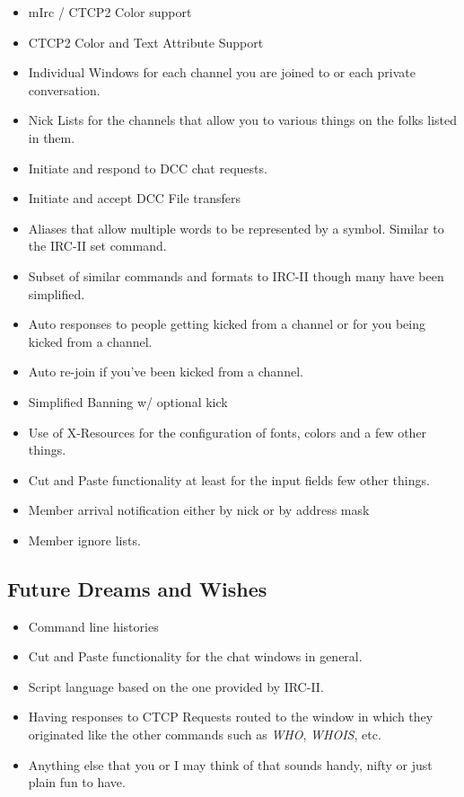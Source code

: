 \documentclass[titlepage]{article}
\begin{document}
\begin{itemize}
\item mIrc / CTCP2 Color support
\item CTCP2 Color and Text Attribute Support
\item Individual Windows for each channel you are joined to or each 
private conversation.
\item Nick Lists for the channels that allow you to various things on 
the folks listed in them.
\item Initiate and respond to DCC chat requests.
\item Initiate and accept DCC File transfers
\item Aliases that allow multiple words to be represented by a symbol.
Similar to the IRC-II set command.
\item Subset of similar commands and formats to IRC-II though many have
been simplified.
\item Auto responses to people getting kicked from a channel or for 
you being kicked from a channel.
\item Auto re-join if you've been kicked from a channel.
\item Simplified Banning w/ optional kick
\item Use of X-Resources for the configuration of fonts, colors and a
few other things.
\item Cut and Paste functionality at least for the input fields
few other things.
\item Member arrival notification either by nick or by address mask
\item Member ignore lists.
\end{itemize}

\subsection{Future Dreams and Wishes}
\begin{itemize}
\item Command line histories
\item Cut and Paste functionality for the chat windows in general.
\item Script language based on the one provided by IRC-II.
\item Having responses to CTCP Requests routed to the window in which they 
originated like the other commands such as \emph{WHO}, \emph{WHOIS}, etc.
\item Anything else that you or I may think of that sounds handy, 
nifty or just plain fun to have.
\end{itemize}
\end{document}
